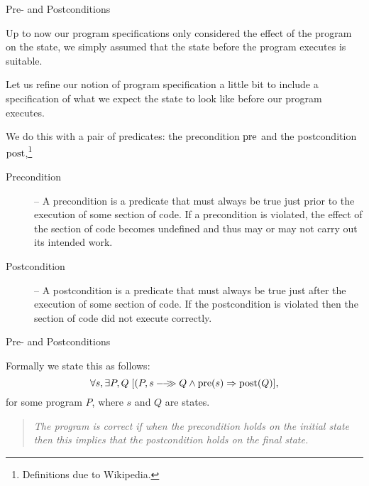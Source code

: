 \documentclass{beamer}
\begin{document}
\begin{frame}[fragile]{Pre- and Postconditions}

\scriptsize

Up to now our program specifications only considered the effect of the program on
the state, we simply assumed that the state before the program executes is suitable.

\vspace{.1in}

Let us refine our notion of program specification a little bit to include a specification
of what we expect the state to look like before our program executes.

\vspace{.1in}

We do this with a pair of predicates: the precondition $\rm pre$ and the postcondition $\rm post$,\footnote{\tiny Definitions due to Wikipedia.}
\begin{description}
\item[Precondition] --
A precondition is a predicate
that must always be true just prior to the execution of some section of code. 
If a precondition is violated,
the effect of the section of code becomes undefined and thus may or may not
carry out its intended work. 

\item[Postcondition] --
A postcondition is a predicate that must always be true just after the execution of some section of code.  If the postcondition is violated then the section of code did not execute correctly.
\end{description}

\end{frame}

\begin{frame}[fragile]{Pre- and Postconditions}

\small

Formally we state this as follows:
\[
\forall s,\exists P,Q\; [{(P,s}-\!\!-\!\!\!\!\gg{Q} \wedge {\rm pre}(s) \Rightarrow{\rm post}(Q)],
\]
for some program $P$, where $s$ and $Q$ are states.

\vspace{.1in}

\begin{quote}
\it The program is correct if when the precondition holds on the initial state then this implies that the
postcondition holds on the final state.
\end{quote}
\end{frame}
\end{document}
